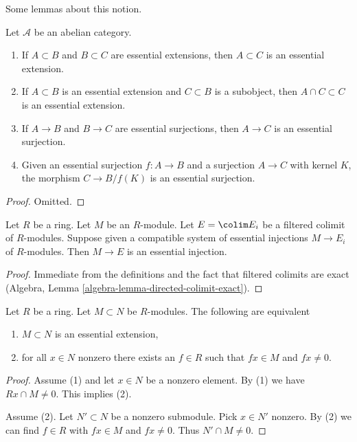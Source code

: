 \noindent
Some lemmas about this notion.

\begin{lemma}
\label{lemma-essential}
Let $\mathcal{A}$ be an abelian category.
\begin{enumerate}
\item If $A \subset B$ and $B \subset C$ are essential extensions, then
$A \subset C$ is an essential extension.
\item If $A \subset B$ is an essential extension and $C \subset B$
is a subobject, then $A \cap C \subset C$ is an essential extension.
\item If $A \to B$ and $B \to C$ are essential surjections, then
$A \to C$ is an essential surjection.
\item Given an essential surjection $f : A \to B$ and a surjection
$A \to C$ with kernel $K$, the morphism $C \to B/f(K)$ is an essential
surjection.
\end{enumerate}
\end{lemma}

\begin{proof}
Omitted.
\end{proof}

\begin{lemma}
\label{lemma-union-essential-extensions}
Let $R$ be a ring. Let $M$ be an $R$-module. Let $E = \colim E_i$
be a filtered colimit of $R$-modules. Suppose given a compatible
system of essential injections $M \to E_i$ of $R$-modules.
Then $M \to E$ is an essential injection.
\end{lemma}

\begin{proof}
Immediate from the definitions and the fact that filtered
colimits are exact (Algebra, Lemma \ref{algebra-lemma-directed-colimit-exact}).
\end{proof}

\begin{lemma}
\label{lemma-essential-extension}
Let $R$ be a ring. Let $M \subset N$ be $R$-modules. The following
are equivalent
\begin{enumerate}
\item $M \subset N$ is an essential extension,
\item for all $x \in N$ nonzero there exists an $f \in R$ such that $fx \in M$
and $fx \not = 0$.
\end{enumerate}
\end{lemma}

\begin{proof}
Assume (1) and let $x \in N$ be a nonzero element. By (1) we have
$Rx \cap M \not = 0$. This implies (2).

\medskip\noindent
Assume (2). Let $N' \subset N$ be a nonzero submodule. Pick $x \in N'$
nonzero. By (2) we can find $f \in R$ with $fx \in M$ and $fx \not = 0$.
Thus $N' \cap M \not = 0$.
\end{proof}




